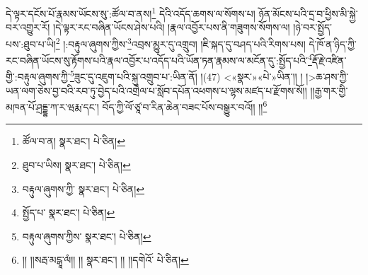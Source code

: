 དེ་ལྟར་དངོས་པོ་རྣམས་ཡོངས་སུ་:ཚོལ་བ་ནས།\footnote{ཚོལ་བ་ན།  སྣར་ཐང་།  པེ་ཅིན། } དེའི་འདོད་ཆགས་ལ་སོགས་པ། ཉོན་མོངས་པའི་དྲ་བ་ཕྱིས་མི་སྐྱེ་བར་འགྱུར་རོ། །དེ་ལྟར་རང་བཞིན་ཡོངས་ཤེས་པའི། །རྣལ་འབྱོར་པས་ནི་གཟུགས་སོགས་ལ། །ཉེ་བར་སྤྱོད་པས་:ཐུབ་པ་ཡི།\footnote{ཐུབ་པ་ཡིས།  སྣར་ཐང་།  པེ་ཅིན། } །:བརྟུལ་ཞུགས་ཀྱིས་\footnote{བརྟུལ་ཞུགས་ཀྱི་  སྣར་ཐང་།  པེ་ཅིན། }འབྲས་མྱུར་དུ་འགྲུབ། །ཇི་སྐད་དུ་བཤད་པའི་རིགས་པས། དེ་ཁོ་ན་ཉིད་ཀྱི་རང་བཞིན་ཡོངས་སུ་རྟོགས་པའི་རྣལ་འབྱོར་པ་འདོད་པའི་ཡོན་ཏན་རྣམས་ལ་མངོན་དུ་:སྤྱོད་པའི་\footnote{སྤྱོད་པ་  སྣར་ཐང་།  པེ་ཅིན། }རྡོ་རྗེ་འཛིན་གྱི་:བརྟུལ་ཞུགས་ཀྱི་\footnote{བརྟུལ་ཞུགས་ཀྱིས་  སྣར་ཐང་།  པེ་ཅིན། }ཟུང་དུ་འཇུག་པའི་སྐུ་འགྲུབ་པ་:ཡིན་ནོ། །(47) <«སྣར་»«པེ་»ཡིན་།། །
།>ཆ་ཤས་ཀྱི་ཡན་ལག་ཅེས་བྱ་བའི་རབ་ཏུ་བྱེད་པའི་འགྲེལ་པ་སློབ་དཔོན་འཕགས་པ་ལྷས་མཛད་པ་རྫོགས་སོ།། །།རྒྱ་གར་གྱི་མཁན་པོ་ཤྲདྡྷ་ཀ་ར་ཝརྨ་དང་། བོད་ཀྱི་ལོ་ཙཱ་བ་རིན་ཆེན་བཟང་པོས་བསྒྱུར་བའོ།། །།\footnote{།། །།སརྦ་མངྒཱ་ལཾ།། །།  སྣར་ཐང་། །། །།དགེའོ་  པེ་ཅིན། }